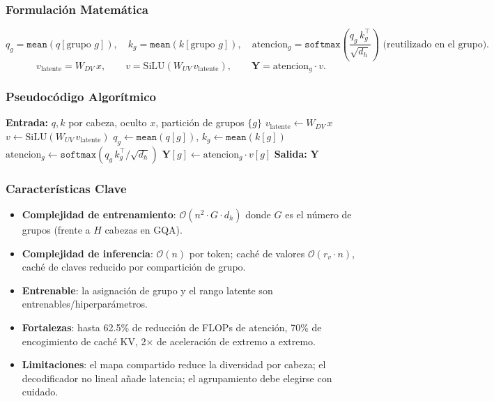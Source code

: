 \subsubsection{Formulación Matemática}
\[
q_g = \texttt{mean}(q[\text{grupo } g]), \quad k_g = \texttt{mean}(k[\text{grupo } g]), \quad
\text{atencion}_g = \texttt{softmax}\!\left(\frac{q_g\, k_g^\top}{\sqrt{d_h}}\right) \text{ (reutilizado en el grupo)}.
\]
\[
v_{\text{latente}} = W_{DV}\, x, \qquad v = \text{SiLU}(W_{UV}\, v_{\text{latente}}), \qquad
\mathbf{Y} = \text{atencion}_g \cdot v.
\]

\subsubsection{Pseudocódigo Algorítmico}
\begin{algorithmic}[1]
\State \textbf{Entrada:} $q, k$ por cabeza, oculto $x$, partición de grupos $\{g\}$
\State $v_{\text{latente}} \gets W_{DV}\, x$ 
\State $v \gets \text{SiLU}(W_{UV}\, v_{\text{latente}})$ 
    \State $q_g \gets \texttt{mean}(q[g])$, \quad $k_g \gets \texttt{mean}(k[g])$ 
    \State $\text{atencion}_g \gets \texttt{softmax}(q_g\, k_g^\top / \sqrt{d_h})$
    \State $\mathbf{Y}[g] \gets \text{atencion}_g \cdot v[g]$ 
\EndFor
\State \textbf{Salida:} $\mathbf{Y}$
\end{algorithmic}

\subsubsection{Características Clave}
\begin{itemize}[leftmargin=*]
    \item \textbf{Complejidad de entrenamiento}: $\mathcal{O}(n^2 \cdot G \cdot d_h)$ donde $G$ es el número de grupos (frente a $H$ cabezas en GQA).
    \item \textbf{Complejidad de inferencia}: $\mathcal{O}(n)$ por token; caché de valores $\mathcal{O}(r_v \cdot n)$, caché de claves reducido por compartición de grupo.
    \item \textbf{Entrenable}: la asignación de grupo y el rango latente son entrenables/hiperparámetros.
    \item \textbf{Fortalezas}: hasta 62.5\% de reducción de FLOPs de atención, 70\% de encogimiento de caché KV, 2$\times$ de aceleración de extremo a extremo.
    \item \textbf{Limitaciones}: el mapa compartido reduce la diversidad por cabeza; el decodificador no lineal añade latencia; el agrupamiento debe elegirse con cuidado.
\end{itemize}

